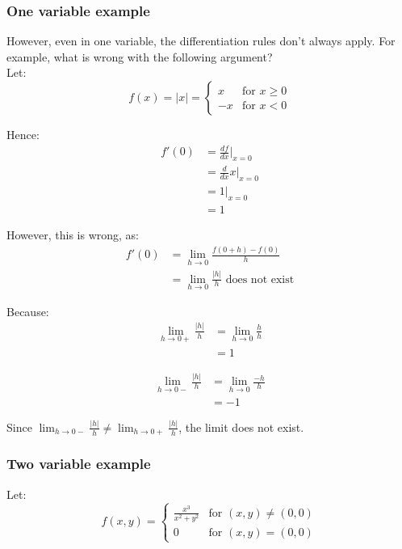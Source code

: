 \documentclass[11pt]{article}
\begin{document}
\subsubsection{One variable example}
\label{sec:org01044cd}
However, even in one variable, the differentiation rules don't always apply. For example, what is wrong with the following argument?
\\[0pt]

Let:
\[
f(x) = |x| = \begin{cases}
x & \text{for } x \ge 0 \\
-x & \text{for } x < 0
\end{cases}
\]

Hence:
\begin{align*}
f'(0) &= \frac{df}{dx}|_{x = 0} \\
&= \frac{d}{dx}x|_{x = 0} \\
&= 1|_{x = 0} \\
&= 1
\end{align*}

However, this is wrong, as:
\begin{align*}
f'(0) &= \lim_{h \rightarrow 0} \frac{f(0 + h) - f(0)}{h} \\
&= \lim_{h \rightarrow 0} \frac{|h|}{h} \text{ does not exist}
\end{align*}

Because:
\begin{align*}
\lim_{h \rightarrow 0+} \frac{|h|}{h} &= \lim_{h \rightarrow 0} \frac{h}{h} \\
&= 1
\end{align*}

\begin{align*}
\lim_{h \rightarrow 0-} \frac{|h|}{h} &= \lim_{h \rightarrow 0} \frac{-h}{h} \\
&= -1
\end{align*}

Since \(\lim_{h \rightarrow 0-} \frac{|h|}{h} \ne \lim_{h \rightarrow 0+} \frac{|h|}{h}\), the limit does not exist.

\newpage

\subsubsection{Two variable example}
\label{sec:orgbf4da7c}
Let:
\[
f(x, y) = \begin{cases}
\frac{x^3}{x^2 + y^2} & \text{for } (x, y) \ne (0, 0) \\
0 & \text{for } (x, y) = (0, 0)
\end{cases}
\]
\end{document}
